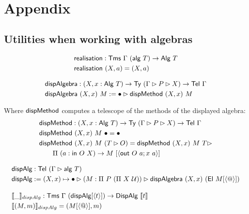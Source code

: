 \section{Appendix}

\subsection{Utilities when working with algebras}

\begin{align*}
&\textsf{realisation} : \textsf{Tms}\ \Gamma\ (\textsf{alg}\ T) \to \textsf{Alg}\ T \\
&\textsf{realisation}\ (X, a) = (X, a)
\end{align*}

\begin{align*}
&\textsf{dispAlgebra} : (X, x : \textsf{Alg}\ T) \to \textsf{Ty}\ (\Gamma \rhd P \rhd X) \to \textsf{Tel}\ \Gamma \\
&\textsf{dispAlgebra}\ (X, x)\ M := \bullet \rhd \textsf{dispMethod}\ (X, x)\ M
\end{align*}

Where $\textsf{dispMethod}$ computes a telescope of the methods of the displayed algebra:
\begin{align*}
&\mta{dispMethod} : (X, x : \mta{Alg}\ T) \to \Ty\ (\Gamma \rhd P \rhd X) \to \Tel\ \Gamma \\
&\mta{dispMethod}\ (X, x)\ M\ \bullet = \bullet \\
&\mta{dispMethod}\ (X, x)\ M\ (T \rhd O) = \mta{dispMethod}\ (X, x)\ M\ T \rhd \\
&\qquad \Pi\ (a : \mta{in}\ O\ X) \to M\ [\Msub{\mta{out}\ O\ a; x\ a}]
\end{align*}

\begin{align*}
&\mta{dispAlg} : \Tel\ (\Gamma \rhd \mta{alg}\ T) \\
&\mta{dispAlg} := (X, x) \mapsto \bullet \rhd (M : \Pi\ P\ (\Pi\ X\ \univ)) \rhd \mta{dispAlgebra}\ (X, x)\ (\mta{El}\ M[\Msub{@}]) \\[1em]
&\llbracket\_\rrbracket_{dispAlg} : \Tms\ \Gamma\ (\mta{dispAlg}[\Msub{t}]) \to \mta{DispAlg}\ \llbracket t \rrbracket \\
&\llbracket (M, m) \rrbracket_{dispAlg} = (M[\Msub{@}], m)
\end{align*}

